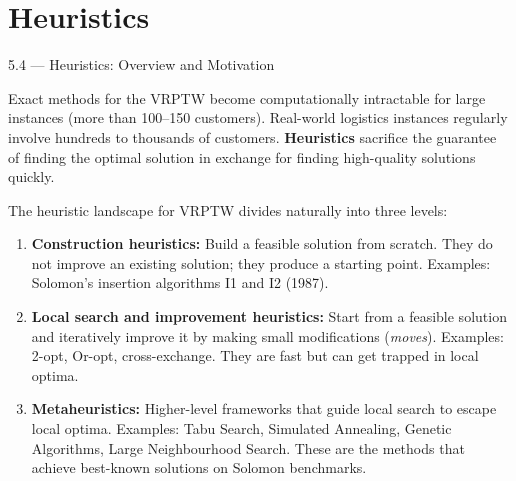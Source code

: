 \documentclass[aspectratio=169,10pt]{beamer}
\begin{document}
\section{Heuristics}

\begin{frame}[allowframebreaks]{5.4 --- Heuristics: Overview and Motivation}

Exact methods for the VRPTW become computationally intractable for large instances
(more than 100--150 customers).  Real-world logistics instances regularly involve
hundreds to thousands of customers.  \textbf{Heuristics} sacrifice the guarantee of
finding the optimal solution in exchange for finding high-quality solutions quickly.

\medskip
The heuristic landscape for VRPTW divides naturally into three levels:

\begin{enumerate}
  \item \textbf{Construction heuristics:} Build a feasible solution from scratch.
    They do not improve an existing solution; they produce a starting point.
    Examples: Solomon's insertion algorithms I1 and I2 (1987).

  \item \textbf{Local search and improvement heuristics:} Start from a feasible
    solution and iteratively improve it by making small modifications
    (\emph{moves}).  Examples: 2-opt, Or-opt, cross-exchange.  They are fast but
    can get trapped in local optima.

  \item \textbf{Metaheuristics:} Higher-level frameworks that guide local search to
    escape local optima.  Examples: Tabu Search, Simulated Annealing, Genetic
    Algorithms, Large Neighbourhood Search.  These are the methods that achieve
    best-known solutions on Solomon benchmarks.
\end{enumerate}

\end{frame}
\end{document}
